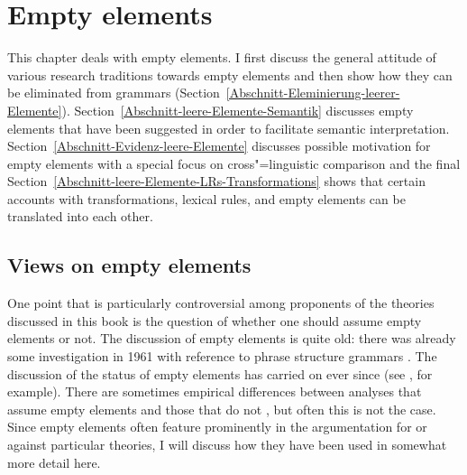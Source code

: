 
\chapter{Empty elements}
\label{Abschnitt-Diskussion-leere-Elemente}
\label{chap-empty}

This chapter deals with empty elements. I first discuss the general attitude of various research
traditions towards empty elements and then show how they can be eliminated from grammars
(Section~\ref{Abschnitt-Eleminierung-leerer-Elemente}). Section~\ref{Abschnitt-leere-Elemente-Semantik} discusses empty elements that
have been suggested in order to facilitate semantic
interpretation. Section~\ref{Abschnitt-Evidenz-leere-Elemente} discusses possible motivation for
empty elements with a special focus on cross"=linguistic comparison and the final Section~\ref{Abschnitt-leere-Elemente-LRs-Transformations} shows
that certain accounts with transformations, lexical rules, and empty elements can be translated into each other.

\section{Views on empty elements}

One point that is particularly controversial among proponents of the theories discussed in this book is the question of whether
one should assume empty elements or not. The discussion of empty elements is quite old: there was already some investigation in 1961 with reference
to phrase structure grammars \citep*{BHPS61a}.
The discussion of the status of empty elements has carried on ever since (see
\citealp*{Loebner86a,Wunderlich87d,Wunderlich89,Stechow89,Haider97a,Sag2000a,BMS2001a,LH2006a,Mueller2004e,AS2015a}, for example). 
There are sometimes empirical differences between analyses that assume empty elements and those that
do not \citep{AS2015a}, but often this is not the case. Since empty elements often feature prominently in the argumentation for or against particular theories, I will discuss
how they have been used in somewhat more detail here.

